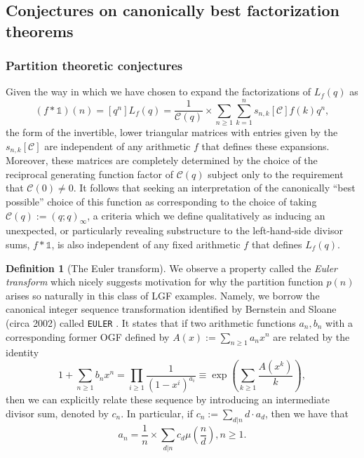 \documentclass[12pt,reqno,a4letter]{article}
\numberwithin{figure}{section}
\numberwithin{table}{section}
\numberwithin{equation}{section}
\theoremstyle{plain}
\numberwithin{theorem}{section}
\theoremstyle{definition}
\newtheorem{definition}[theorem]{Definition}
\begin{document}
\subsection{Conjectures on canonically best factorization theorems} 

\subsubsection{Partition theoretic conjectures}
\label{subSection_LGFCaseExampleAnalysis_MotivatingByTheEulerTForm} 

Given the way in which we have chosen to expand the factorizations of $L_f(q)$ as 
\[
(f \ast \mathds{1})(n) = [q^n] L_f(q) = \frac{1}{\mathcal{C}(q)} \times \sum_{n \geq 1} \sum_{k=1}^{n} 
     s_{n,k}[\mathcal{C}] f(k) q^n, 
\]
the form of the invertible, lower triangular matrices with entries given by the $s_{n,k}[\mathcal{C}]$ are 
independent of any arithmetic $f$ that defines these expansions. 
Moreover, these matrices are completely determined by the choice of the reciprocal 
generating function factor of $\mathcal{C}(q)$ subject only to the 
requirement that $\mathcal{C}(0) \neq 0$. 
It follows that seeking an interpretation of the canonically ``best possible'' 
choice of this function as corresponding to the choice of taking 
$\mathcal{C}(q) := (q; q)_{\infty}$, a criteria which we define qualitatively as 
inducing an unexpected, or particularly revealing substructure to the left-hand-side 
divisor sums, $f \ast \mathds{1}$, is also independent of any fixed arithmetic $f$ that 
defines $L_{f}(q)$. 

\begin{definition}[The Euler transform]
We observe a property called the \emph{Euler transform} 
which nicely suggests motivation for why the partition function $p(n)$ arises so 
naturally in this class of LGF examples. 
Namely, we borrow the canonical integer sequence transformation 
identified by Bernstein and Sloane (circa 2002) 
called \texttt{EULER} \cite{OEIS-EULERTF-REF}. 
It states that if two arithmetic functions 
$a_n,b_n$ with a corresponding former OGF defined by 
$A(x) := \sum_{n \geq 1} a_n x^n$ are related by the identity 
\[
1 + \sum_{n \geq 1} b_n x^n = \prod_{i \geq 1} \frac{1}{(1-x^i)^{a_i}} \equiv 
     \exp\left(\sum_{k \geq 1} \frac{A(x^k)}{k}\right), 
\]
then we can explicitly relate these sequence by introducing an intermediate divisor sum, denoted by $c_n$. 
In particular, if $c_n := \sum_{d|n} d \cdot a_d$, then we have that 
\[
a_n = \frac{1}{n} \times \sum_{d|n} c_d \mu\left(\frac{n}{d}\right), n \geq 1. 
\]
\end{definition} 
\end{document}
